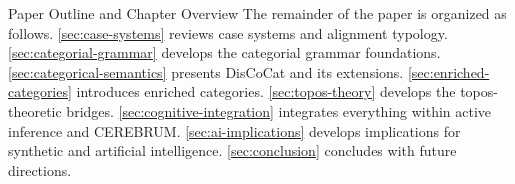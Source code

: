 \documentclass[
  ignorenonframetext,
]{beamer}
\begin{document}
\begin{frame}{Paper Outline and Chapter Overview}
\protect{}\label{paper-outline-and-chapter-overview}
The remainder of the paper is organized as follows.
\autoref{sec:case-systems} reviews case systems and alignment typology.
\autoref{sec:categorial-grammar} develops the categorial grammar
foundations. \autoref{sec:categorical-semantics} presents DisCoCat and
its extensions. \autoref{sec:enriched-categories} introduces enriched
categories. \autoref{sec:topos-theory} develops the topos-theoretic
bridges. \autoref{sec:cognitive-integration} integrates everything
within active inference and CEREBRUM. \autoref{sec:ai-implications}
develops implications for synthetic and artificial intelligence.
\autoref{sec:conclusion} concludes with future directions.
\end{frame}
\end{document}
